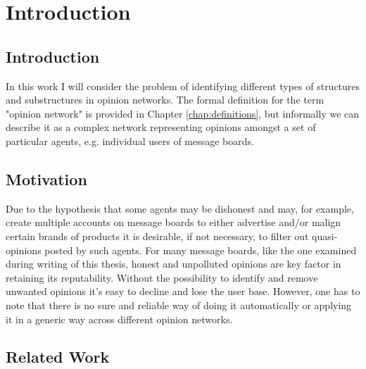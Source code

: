 \chapter{Introduction}

	\section{Introduction}

		In this work I will consider the problem of identifying different types of structures and substructures in opinion networks. The formal definition for the term "opinion network" is provided in Chapter \ref{chap:definitions}, but informally we can describe it as a complex network representing opinions amongst a set of particular agents, e.g. individual users of message boards.
		
	
	\section{Motivation}

		Due to the hypothesis that some agents may be dishonest and may, for example, create multiple accounts on message boards to either advertise and/or malign certain brands of products it is desirable, if not necessary, to filter out quasi-opinions posted by such agents. For many message boards, like the one examined during writing of this thesis, honest and unpolluted opinions are key factor in retaining its reputability. Without the possibility to identify and remove unwanted opinions it's easy to decline and lose the user base. However, one has to note that there is no sure and reliable way of doing it automatically or applying it in a generic way across different opinion networks.
		
	\section{Related Work}
		